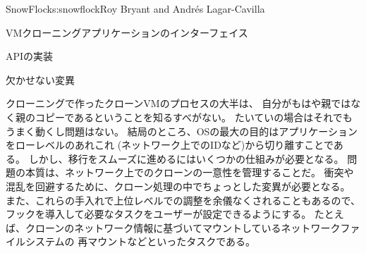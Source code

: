 \begin{aosachapter}{SnowFlock}{s:snowflock}{Roy Bryant and Andr\'e{s} Lagar-Cavilla}
\begin{aosasect1}{VMクローニングアプリケーションのインターフェイス}
\begin{aosasect2}{APIの実装}
\end{aosasect2}

\begin{aosasect2}{欠かせない変異}

クローニングで作ったクローンVMのプロセスの大半は、
自分がもはや親ではなく親のコピーであるということを知るすべがない。
たいていの場合はそれでもうまく動くし問題はない。
結局のところ、OSの最大の目的はアプリケーションをローレベルのあれこれ
(ネットワーク上でのIDなど)から切り離すことである。
しかし、移行をスムーズに進めるにはいくつかの仕組みが必要となる。
問題の本質は、ネットワーク上でのクローンの一意性を管理することだ。
衝突や混乱を回避するために、クローン処理の中でちょっとした変異が必要となる。
また、これらの手入れで上位レベルでの調整を余儀なくされることもあるので、
フックを導入して必要なタスクをユーザーが設定できるようにする。
たとえば、クローンのネットワーク情報に基づいてマウントしているネットワークファイルシステムの
再マウントなどといったタスクである。


\end{aosasect2}
\end{aosasect1}
\end{aosachapter}

